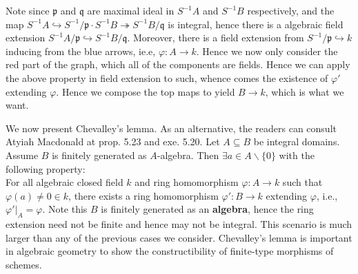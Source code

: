 \documentclass[12pt]{article}
\theoremstyle{definition}
\theoremstyle{plain}
\newcommand{\inj}{\hookrightarrow}
\newcommand{\surj}{\twoheadrightarrow}
\begin{document}
Note since $\mathfrak{p}$ and $\mathfrak{q}$ are maximal ideal in $S^{-1}A$ and $S^{-1}B$ respectively, and the map $S^{-1}A\inj S^{-1}/\mathfrak{p}\cdot S^{-1}B\surj S^{-1}B/\mathfrak{q}$ is integral, hence there is a algebraic field extension $S^{-1}A/\mathfrak{p}\inj S^{-1}B/\mathfrak{q}$. Moreover, there is a field extension from $S^{-1}/\mathfrak{p}\inj k$ inducing from the blue arrows, ie.e, $\varphi:A\to k$. Hence we now only consider the red part of the graph, which all of the components are fields. Hence we can apply the above property in field extension to such, whence comes the existence of $\varphi'$ extending $\varphi$. Hence we compose the top maps to yield $B\to k$, which is what we want.\qedhere

\medskip
We now present Chevalley's lemma. As an alternative, the readers can consult Atyiah Macdonald at prop. 5.23 and exe. 5.20.
 Let $A\subseteq B$ be integral domains. Assume $B$ is finitely generated as $A$-algebra. Then $\exists a\in A\backslash\{0\}$ with the following property:\\ \indent For all algebraic closed field $k$ and ring homomorphism $\varphi: A\to k$ such that $\varphi(a)\neq 0\in k$, there exists a ring homomorphism $\varphi':B\to k$ extending $\varphi$, i.e., $\varphi'|_A=\varphi$.
\Rmk Note this $B$ is finitely generated as an \textbf{algebra}, hence the ring extension need not be finite and hence may not be integral. This scenario is much larger than any of the previous cases we consider. Chevalley's lemma is important in algebraic geometry to show the constructibility of finite-type morphisms of schemes.
\end{document}
